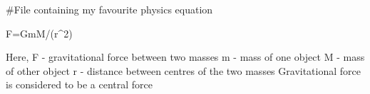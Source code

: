 #File containing my favourite physics equation 

F=GmM/(r^2)

Here, 
F - gravitational force between two masses
m - mass of one object
M - mass of other object
r - distance between centres of the two masses 
Gravitational force is considered to be a central force
